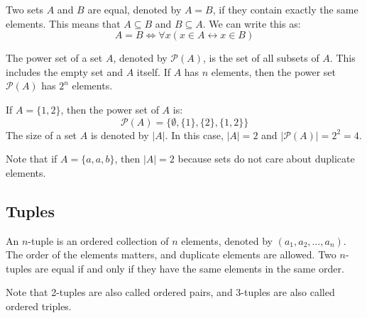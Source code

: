 \begin{definition}
    Two sets $A$ and $B$ are equal, denoted by $A = B$, if they contain exactly the same elements. This means that $A \subseteq B$ and $B \subseteq A$. We can write this as:
    \[ A = B \iff \forall x(x \in A \leftrightarrow x \in B) \]
\end{definition}

\begin{definition}
    The power set of a set $A$, denoted by $\mathcal{P}(A)$, is the set of all subsets of $A$. This includes the empty set and $A$ itself. If $A$ has $n$ elements, then the power set $\mathcal{P}(A)$ has $2^n$ elements.
\end{definition}
\begin{eg}
    If $A = \{1, 2\}$, then the power set of $A$ is:
    \[ \mathcal{P}(A) = \{\emptyset, \{1\}, \{2\}, \{1, 2\}\} \]
    The size of a set $A$ is denoted by $|A|$. In this case, $|A| = 2$ and $|\mathcal{P}(A)| = 2^2 = 4$.
\end{eg}
Note that if $A = \{a, a, b\}$, then $|A| = 2$ because sets do not care about duplicate elements.

\subsection{Tuples}
\begin{definition}[Tuple]
    An $n$-tuple is an ordered collection of $n$ elements, denoted by $(a_1, a_2, \ldots, a_n)$. The order of the elements matters, and duplicate elements are allowed. Two $n$-tuples are equal if and only if they have the same elements in the same order.
\end{definition}
Note that 2-tuples are also called ordered pairs, and 3-tuples are also called ordered triples.

